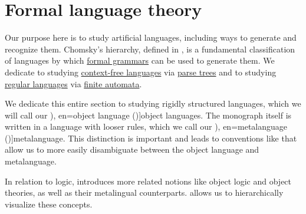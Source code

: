 \section{Formal language theory}\label{sec:formal_language_theory}

Our purpose here is to study artificial languages, including ways to generate and recognize them. Chomsky's hierarchy, defined in , is a fundamental classification of languages by which \hyperref[def:formal_grammar]{formal grammars} can be used to generate them. We dedicate  to studying \hyperref[def:chomsky_hierarchy/context_free]{context-free languages} via \hyperref[def:parse_tree]{parse trees} and  to studying \hyperref[def:chomsky_hierarchy/regular]{regular languages} via \hyperref[def:finite_automaton]{finite automata}.

\begin{concept}\label{con:metalanguage}
  We dedicate this entire section to studying rigidly structured languages, which we will call our \term[ru=предметный язык (\cite[35]{Герасимов2011}), en=object language (\cite[3]{Kleene2002Logic})]{object languages}. The monograph itself is written in a language with looser rules, which we call our \term[ru=метаязык (\cite[35]{Герасимов2011}), en=metalanguage (\cite[3]{Kleene2002Logic})]{metalanguage}. This distinction is important and leads to conventions like  that allow us to more easily disambiguate between the object language and metalanguage.

  In relation to logic,  introduces more related notions like object logic and object theories, as well as their metalingual counterparts.  allows us to hierarchically visualize these concepts.
\end{concept}

